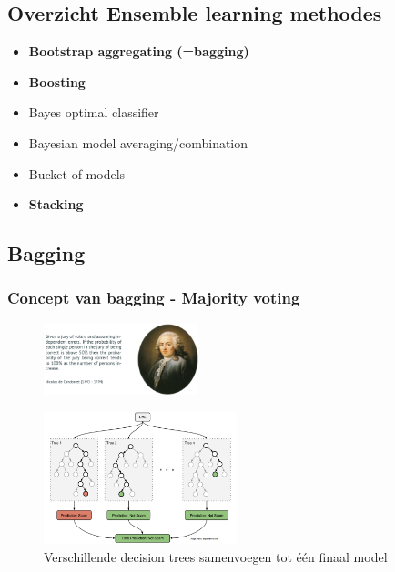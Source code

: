 \documentclass{article}
\begin{document}
\subsection{Overzicht Ensemble learning methodes}

\begin{itemize}
    \item \textbf{Bootstrap aggregating (=bagging)}
    \item \textbf{Boosting}
    \item Bayes optimal classifier
    \item Bayesian model averaging/combination
    \item Bucket of models
    \item \textbf{Stacking}
\end{itemize}

\subsection{Bagging}

\subsubsection{Concept van bagging - Majority voting}

\begin{figure}[H]
    \centering
    \includegraphics[width=0.4\textwidth]{ensemble-learning-jury.png}
\end{figure}

\begin{figure}[H]
    \centering
    \includegraphics[width=0.5\textwidth]{bagging.png}
    \caption{Verschillende decision trees samenvoegen tot één finaal model}
\end{figure}
\end{document}
